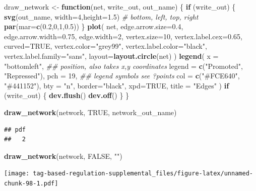 \documentclass[
]{book}
\newenvironment{Shaded}{\begin{snugshade}}{\end{snugshade}}
\newcommand{\CommentTok}[1]{\textcolor[rgb]{0.56,0.35,0.01}{\textit{#1}}}
\newcommand{\ControlFlowTok}[1]{\textcolor[rgb]{0.13,0.29,0.53}{\textbf{#1}}}
\newcommand{\DataTypeTok}[1]{\textcolor[rgb]{0.13,0.29,0.53}{#1}}
\newcommand{\DecValTok}[1]{\textcolor[rgb]{0.00,0.00,0.81}{#1}}
\newcommand{\FloatTok}[1]{\textcolor[rgb]{0.00,0.00,0.81}{#1}}
\newcommand{\KeywordTok}[1]{\textcolor[rgb]{0.13,0.29,0.53}{\textbf{#1}}}
\newcommand{\NormalTok}[1]{#1}
\newcommand{\OtherTok}[1]{\textcolor[rgb]{0.56,0.35,0.01}{#1}}
\newcommand{\StringTok}[1]{\textcolor[rgb]{0.31,0.60,0.02}{#1}}
\begin{document}
\begin{Shaded}
\begin{Highlighting}[]
\NormalTok{draw\_network \textless{}{-}}\StringTok{ }\ControlFlowTok{function}\NormalTok{(net, write\_out, out\_name) \{}
  \ControlFlowTok{if}\NormalTok{ (write\_out) \{}
    \KeywordTok{svg}\NormalTok{(out\_name, }\DataTypeTok{width=}\DecValTok{4}\NormalTok{,}\DataTypeTok{height=}\FloatTok{1.5}\NormalTok{)}
    \CommentTok{\# bottom, left, top, right}
    \KeywordTok{par}\NormalTok{(}\DataTypeTok{mar=}\KeywordTok{c}\NormalTok{(}\FloatTok{0.2}\NormalTok{,}\DecValTok{0}\NormalTok{,}\DecValTok{1}\NormalTok{,}\FloatTok{0.5}\NormalTok{))}
\NormalTok{  \}}
  \KeywordTok{plot}\NormalTok{(}
\NormalTok{    net,}
    \DataTypeTok{edge.arrow.size=}\FloatTok{0.4}\NormalTok{,}
    \DataTypeTok{edge.arrow.width=}\FloatTok{0.75}\NormalTok{,}
    \DataTypeTok{edge.width=}\DecValTok{2}\NormalTok{,}
    \DataTypeTok{vertex.size=}\DecValTok{10}\NormalTok{,}
    \DataTypeTok{vertex.label.cex=}\FloatTok{0.65}\NormalTok{,}
    \DataTypeTok{curved=}\OtherTok{TRUE}\NormalTok{,}
    \DataTypeTok{vertex.color=}\StringTok{"grey99"}\NormalTok{,}
    \DataTypeTok{vertex.label.color=}\StringTok{"black"}\NormalTok{,}
    \DataTypeTok{vertex.label.family=}\StringTok{"sans"}\NormalTok{,}
    \DataTypeTok{layout=}\KeywordTok{layout.circle}\NormalTok{(net)}
\NormalTok{  )}
  \KeywordTok{legend}\NormalTok{(}
    \DataTypeTok{x =} \StringTok{"bottomleft"}\NormalTok{,      }\CommentTok{\#\# position, also takes x,y coordinates}
    \DataTypeTok{legend =} \KeywordTok{c}\NormalTok{(}\StringTok{"Promoted"}\NormalTok{, }\StringTok{"Repressed"}\NormalTok{),}
    \DataTypeTok{pch =} \DecValTok{19}\NormalTok{,              }\CommentTok{\#\# legend symbols see ?points}
    \DataTypeTok{col =} \KeywordTok{c}\NormalTok{(}\StringTok{"\#FCE640"}\NormalTok{, }\StringTok{"\#441152"}\NormalTok{),}
    \DataTypeTok{bty =} \StringTok{"n"}\NormalTok{,}
    \DataTypeTok{border=}\StringTok{"black"}\NormalTok{,}
    \DataTypeTok{xpd=}\OtherTok{TRUE}\NormalTok{,}
    \DataTypeTok{title =} \StringTok{"Edges"}
\NormalTok{  )}
  \ControlFlowTok{if}\NormalTok{ (write\_out) \{}
    \KeywordTok{dev.flush}\NormalTok{()}
    \KeywordTok{dev.off}\NormalTok{()}
\NormalTok{  \}}
\NormalTok{\}}

\KeywordTok{draw\_network}\NormalTok{(network, }\OtherTok{TRUE}\NormalTok{, network\_out\_name)}
\end{Highlighting}
\end{Shaded}

\begin{verbatim}
## pdf 
##   2
\end{verbatim}

\begin{Shaded}
\begin{Highlighting}[]
\KeywordTok{draw\_network}\NormalTok{(network, }\OtherTok{FALSE}\NormalTok{, }\StringTok{""}\NormalTok{)}
\end{Highlighting}
\end{Shaded}

\texttt{[image: tag-based-regulation-supplemental\_files/figure-latex/unnamed-chunk-98-1.pdf]}

  
\end{document}
